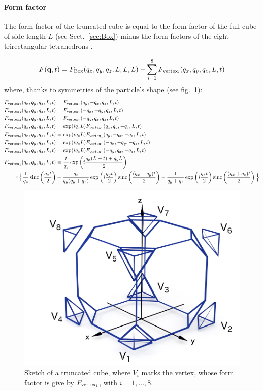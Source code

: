 \paragraph{Form factor}
The form factor of the truncated cube is equal to the form factor of the full cube of side length $L$ (see Sect.~\ref{sec:Box}) minus the form factors of the eight trirectangular tetrahedrons \cite{HeSS74}.

\begin{equation*}
F(\mathbf{q},t) =F_{\rm{Box}}(q_x,q_y,q_z, L, L, L) - \sum_{i=1}^8 F_{\rm{vertex}_i}(q_x, q_y, q_z, L, t)
\end{equation*}
where, thanks to symmetries of the particle's shape (see fig.~\ref{fig:FFTrcubesketchaxes}):
\begin{align*}
F_{\rm{vertex}_2}(q_x, q_y, q_z, L, t) &= F_{\rm{vertex}_1}(q_y, -q_x, q_z, L, t) \\
F_{\rm{vertex}_3}(q_x, q_y, q_z, L, t) &= F_{\rm{vertex}_1}(-q_x, -q_y, q_z, L, t) \\
F_{\rm{vertex}_4}(q_x, q_y, q_z, L, t) &= F_{\rm{vertex}_1}(-q_y, q_x, q_z, L, t) \\
F_{\rm{vertex}_5}(q_x, q_y, q_z, L, t) &= \exp(iq_zL)F_{\rm{vertex}_1}(q_x, q_y, -q_z, L, t) \\
F_{\rm{vertex}_6}(q_x, q_y, q_z, L, t) &= \exp(iq_zL)F_{\rm{vertex}_1}(q_y, -q_x,- q_z, L, t) \\
F_{\rm{vertex}_7}(q_x, q_y, q_z, L, t) &= \exp(iq_zL)F_{\rm{vertex}_1}(-q_x, -q_y, -q_z, L, t) \\
F_{\rm{vertex}_8}(q_x, q_y, q_z, L, t) &= \exp(iq_zL)F_{\rm{vertex}_1}(-q_y, q_x, -q_z, L, t) \\
F_{\rm{vertex}_1}(q_x, q_y, q_z, L, t) &=\frac{t}{q_z}\exp\left( i\frac{q_x(L-t)+ q_y L}{2} \right) \\
\times \Big\{ \frac{1}{q_y} \operatorname{sinc}\left( \frac{q_x t}{2}\right) &- \frac{q_z}{q_y(q_y + q_z)} \exp\left(i\frac{q_yt}{2}\right) \operatorname{sinc}\left( \frac{(q_x-q_y)t}{2}\right) - \frac{1}{q_y + q_z} \exp\left( i\frac{q_z t}{2} \right) \operatorname{sinc} \left( \frac{(q_x+q_z) t}{2} \right)  \Big\}    
\end{align*}

\begin{figure}[h]
\begin{center}
\includegraphics[width=.5\textwidth]{fig/drawing/SketchTruncatedcube.png}
\end{center}
\caption{Sketch of a truncated cube, where $V_i$ marks the vertex, whose form factor is give by $F_{\rm{vertex}_i}$, with $i=1,..., 8$.}
\label{fig:FFTrcubesketchaxes}
\end{figure}

